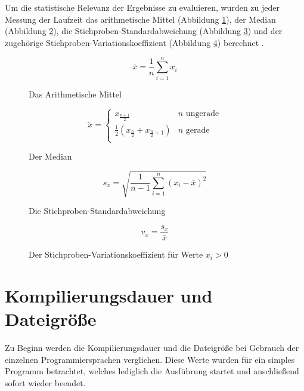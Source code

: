 Um die statistische Relevanz der Ergebnisse zu evaluieren, wurden zu jeder Messung der Laufzeit
das arithmetische Mittel (Abbildung \ref{formula:mean}),
der Median (Abbildung \ref{formula:median}),
die Stichproben-Standardabweichung (Abbildung \ref{formula:std_deviation}) und
der zugehörige Stichproben-Variationskoeffizient (Abbildung \ref{formula:variation_coefficient}) berechnet
\cite{wtSkript}.

\begin{figure}
	\caption{Das Arithmetische Mittel}
	\begin{equation*}
		\bar{x} = \frac{1}{n} \sum_{i=1}^n{x_i}
	\end{equation*}
	\label{formula:mean}
\end{figure}

\begin{figure}
	\caption{Der Median}
	\begin{equation*}
		\tilde{x} =
		\begin{cases}
			x_{\frac{n + 1}{2}} & n \text{ ungerade} \\
			\frac{1}{2}(x_\frac{n}{2} + x_{\frac{n}{2} + 1}) & n \text{ gerade} \\
		\end{cases}
	\end{equation*}
	\label{formula:median}
\end{figure}

\begin{figure}
	\caption{Die Stichproben-Standardabweichung}
	\begin{equation*}
		s_x = \sqrt{\frac{1}{n - 1} \sum_{i=1}^n{(x_i - \bar{x})^2}}
	\end{equation*}
	\label{formula:std_deviation}
\end{figure}

\begin{figure}
	\caption{Der Stichproben-Variationskoeffizient für Werte $x_i > 0$}
	\begin{equation*}
		v_x = \frac{s_x}{\bar{x}}
	\end{equation*}
	\label{formula:variation_coefficient}
\end{figure}



\section{Kompilierungsdauer und Dateigröße}\label{sec:compile_time_filesize}

Zu Beginn werden die Kompilierungsdauer und die Dateigröße bei Gebrauch der einzelnen Programmiersprachen
verglichen. Diese Werte wurden für ein simples Programm betrachtet, welches lediglich die Ausführung startet und
anschließend sofort wieder beendet.

